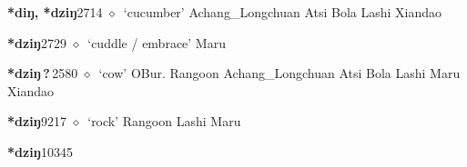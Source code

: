   \begin{list}{}{\leftmargin=1.5em \itemindent=-1.5em}
  \item {\footnotesize \textbf{*diŋ, *dziŋ}}{\tiny 2714}
         $\diamond$~`cucumber'
         Achang\_Longchuan 
\hspace{1ex}
         Atsi 
\hspace{1ex}
         Bola 
\hspace{1ex}
         Lashi 
\hspace{1ex}
         Xiandao 
  \item {\footnotesize \textbf{*dziŋ}}{\tiny 2729}
\hspace{1ex}
         $\diamond$~`cuddle / embrace'
         Maru 
  \item {\footnotesize \textbf{*dziŋ\,?\,}}{\tiny 2580}
\hspace{1ex}
         $\diamond$~`cow'
         OBur. 
\hspace{1ex}
         Rangoon 
\hspace{1ex}
         Achang\_Longchuan 
\hspace{1ex}
         Atsi 
\hspace{1ex}
         Bola 
\hspace{1ex}
         Lashi 
\hspace{1ex}
         Maru 
\hspace{1ex}
         Xiandao 
  \item {\footnotesize \textbf{*dziŋ}}{\tiny 9217}
\hspace{1ex}
         $\diamond$~`rock'
         Rangoon 
\hspace{1ex}
         Lashi 
\hspace{1ex}
         Maru 
  \item {\footnotesize \textbf{*dziŋ}}{\tiny 10345}

\end{list}
